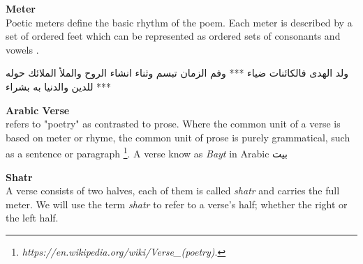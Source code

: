 
    \newpage
\begin{definition}\label{def:meter}
  \textbf{Meter} \hfill \\
  Poetic meters define the basic rhythm of the poem. Each meter is described by a set of ordered feet which can
be represented as ordered sets of consonants and vowels \cite{Almuhareb2015}.


\begin{Arabic}
	\begin{traditionalpoem*}
          ولد الهدى فالكائنات ضياء *** وفم الزمان تبسم وثناء انشاء
          الروح والملأ الملائك حوله *** للدين والدنيا به بشراء

	\end{traditionalpoem*}
\end{Arabic}%



\end{definition}


\begin{definition}\label{def:verse}
  \textbf{Arabic Verse} \hfill \\ refers to "poetry" as contrasted to prose. Where the common unit of a verse is based on meter or rhyme, the common unit of prose is purely grammatical, such as a sentence or paragraph \footnote{\textit{ https://en.wikipedia.org/wiki/Verse\_(poetry)}.}. A verse know as \textit{Bayt} in Arabic \textarabic{بيت}

\end{definition}


\begin{definition}\label{def:shatr}
  \textbf{Shatr} \hfill \\  A verse consists of two halves, each of them is called \textit{shatr} and carries the full meter.  We will use the term \textit{shatr} to refer to a verse's half; whether the right or the left half.
\end{definition}




